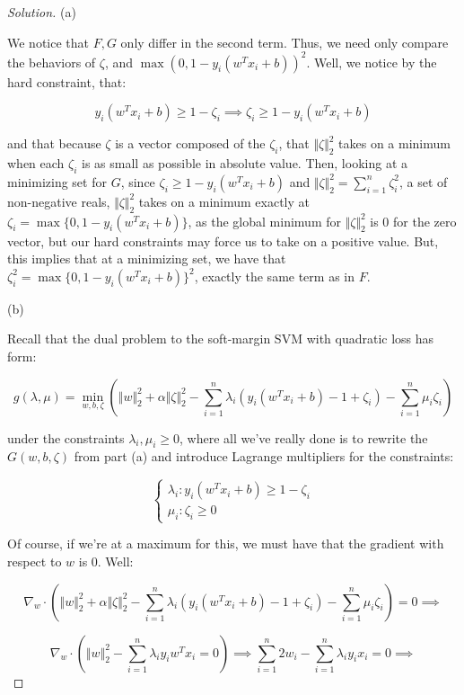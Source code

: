 \documentclass[10pt]{article}
\begin{document}
\begin{proof}[Solution]

(a)

We notice that $F,G$ only differ in the second term. Thus, we need only compare the behaviors of $\zeta$, and $\max(0,1 - y_i(w^T x_i + b))^2$. Well, we notice by the hard constraint, that:

$$ y_i (w^T x_i + b) \geq 1 - \zeta_i \implies \zeta_i \geq 1 -  y_i (w^T x_i + b)$$

and that because $\zeta$ is a vector composed of the $\zeta_i$, that $\Vert \zeta \Vert_2^2$ takes on a minimum when each $\zeta_i $ is as small as possible in absolute value. Then, looking at a minimizing set for $G$, since $\zeta_i \geq  1 -  y_i (w^T x_i + b)$ and $\Vert \zeta \Vert_2^2 = \sum_{i=1}^n \zeta_i^2$, a set of non-negative reals, $\Vert \zeta \Vert_2^2$ takes on a minimum exactly at $\zeta_i = \max\{0,1 - y_i(w^T x_i + b) \}$, as the global minimum for $\Vert \zeta \Vert_2^2$ is 0 for the zero vector, but our hard constraints may force us to take on a positive value. But, this implies that at a minimizing set, we have that $\zeta_i^2 = \max\{0,1 - y_i(w^T x_i + b) \}^2$, exactly the same term as in $F$.

(b)

Recall that the dual problem to the soft-margin SVM with quadratic loss has form:

$$g(\lambda, \mu) = \min_{w,b,\zeta} \left( \Vert w \Vert_2^2 + \alpha \Vert \zeta \Vert_2^2 -  \sum_{i=1}^n \lambda_i (y_i (w^T x_i + b) - 1 + \zeta_i) - \sum_{i=1}^n \mu_i \zeta_i \right)$$

under the constraints $\lambda_i, \mu_i \geq 0$, where all we've really done is to rewrite the $G(w,b,\zeta)$ from part (a) and introduce Lagrange multipliers for the constraints:

$$ \begin{cases} \lambda_i: y_i(w^T x_i + b) \geq 1  - \zeta_i \\ \mu_i: \zeta_i \geq 0 \end{cases} $$

Of course, if we're at a maximum for this, we must have that the gradient with respect to $w$ is 0. Well:

$$\nabla_w \cdot  \left( \Vert w \Vert_2^2 + \alpha \Vert \zeta \Vert_2^2 -  \sum_{i=1}^n \lambda_i (y_i (w^T x_i + b) - 1 + \zeta_i) - \sum_{i=1}^n \mu_i \zeta_i \right) =  0 \implies$$

$$ \nabla_w \cdot \left( \Vert w \Vert_2^2 - \sum_{i=1}^n \lambda_i y_i w^T x_i  = 0\right) \implies \sum_{i=1}^n 2w_i - \sum_{i=1}^n \lambda_i y_i x_i= 0 \implies$$


\end{proof}
\end{document}
